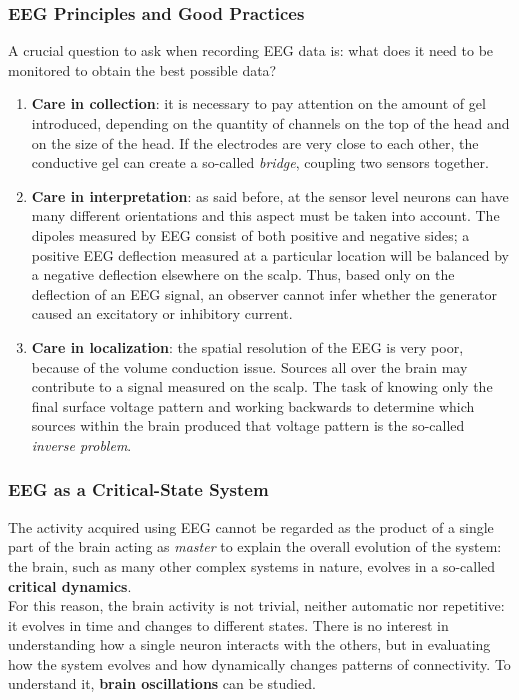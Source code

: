 \subsubsection{EEG Principles and Good Practices}
A crucial question to ask when recording EEG data is: what does it need to be monitored to
obtain the best possible data?
\begin{enumerate}
    \item \textbf{Care in collection}: it is necessary to pay attention on the amount of gel
          introduced, depending on the quantity of channels on the top of the head and on the
          size of the head. If the electrodes are very close to each other, the conductive gel
          can create a so-called \textit{bridge}, coupling two sensors together.
    \item \textbf{Care in interpretation}: as said before, at the sensor level neurons can have
          many different orientations and this aspect must be taken into account. The dipoles
          measured by EEG consist of both positive and negative sides; a positive EEG
          deflection measured at a particular location will be balanced by a negative
          deflection elsewhere on the scalp. Thus, based only on the deflection of an EEG
          signal, an observer cannot infer whether the generator caused an excitatory or
          inhibitory current.
    \item \textbf{Care in localization}: the spatial resolution of the EEG is very poor,
          because of the volume conduction issue. Sources all over the brain may
          contribute to a signal measured on the scalp. The task of knowing only the final
          surface voltage pattern and working backwards to determine which sources within
          the brain produced that voltage pattern is the so-called \textit{inverse problem}.
\end{enumerate}
\subsubsection{EEG as a Critical-State System}
The activity acquired using EEG cannot be regarded as the product of a single part of the brain
acting as \textit{master} to explain the overall evolution of the system: the brain, such
as many other complex systems in nature, evolves in a so-called \textbf{critical dynamics}.\\
For this reason, the brain activity is not trivial, neither automatic nor repetitive: it evolves in
time and changes to different states. There is no interest in understanding how a single
neuron interacts with the others, but in evaluating how the system evolves and how
dynamically changes patterns of connectivity. To understand it, \textbf{brain oscillations}
can be studied.

